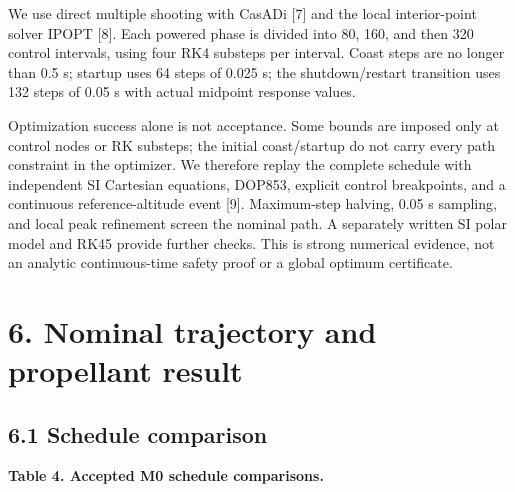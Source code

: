 \documentclass[
  11pt,
  a4paper,
]{article}
\begin{document}
We use direct multiple shooting with CasADi {[}7{]} and the local
interior-point solver IPOPT {[}8{]}. Each powered phase is divided into
80, 160, and then 320 control intervals, using four RK4 substeps per
interval. Coast steps are no longer than 0.5 s; startup uses 64 steps of
0.025 s; the shutdown/restart transition uses 132 steps of 0.05 s with
actual midpoint response values.

Optimization success alone is not acceptance. Some bounds are imposed
only at control nodes or RK substeps; the initial coast/startup do not
carry every path constraint in the optimizer. We therefore replay the
complete schedule with independent SI Cartesian equations, DOP853,
explicit control breakpoints, and a continuous reference-altitude event
{[}9{]}. Maximum-step halving, 0.05 s sampling, and local peak
refinement screen the nominal path. A separately written SI polar model
and RK45 provide further checks. This is strong numerical evidence, not
an analytic continuous-time safety proof or a global optimum
certificate.

\section{6. Nominal trajectory and propellant
result}\label{nominal-trajectory-and-propellant-result}

\subsection{6.1 Schedule comparison}\label{schedule-comparison}

\textbf{Table 4. Accepted M0 schedule comparisons.}
\end{document}
